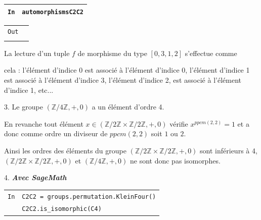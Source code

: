 \documentclass[titlepage]{article}
\begin{document}
    \begin{tabularx}{11.5cm}{|p{0.60cm}|X|}
        \hline
        \verb|In|
        & 
        \verb|automorphismsC2C2|
        \\
        \hline
    \end{tabularx}

    \begin{tabularx}{11.5cm}{|p{0.60cm}|X|}
        \hline
        \verb|Out|
        & 
        \verb|[[0, 1, 2, 3],
        [0, 1, 3, 2],
        [0, 2, 1, 3],
        |
        \\
        \verb||
        &
        \verb|[0, 2, 3, 1],
        [0, 3, 1, 2],
        [0, 3, 2, 1]]|
        \\
        \hline
    \end{tabularx}\newline

    La lecture d'un tuple $f$ de morphisme du type $[0, 3, 1, 2]$ s'effectue comme 
    
    cela : l'élément d'indice 0 est associé à l'élément d'indice 0,
    l'élément d'indice 1 est associé à l'élément d'indice 3, l'élément d'indice 2, est associé à l'élément d'indice 1, etc...
    \newline

    3. Le groupe $(\mathbb{Z}/4\mathbb{Z}, +, 0)$ a un élément d'ordre 4.\newline
    
    En revanche tout élément $x \in (\mathbb{Z}/2\mathbb{Z} \times \mathbb{Z}/2\mathbb{Z}, +, 0)$ vérifie $x^{ppcm(2,2)} = 1$ et a donc comme ordre un diviseur de $ppcm(2,2)$ soit $1$ ou $2$.\newline
    
    Ainsi les ordres des éléments du groupe $(\mathbb{Z}/2\mathbb{Z} \times \mathbb{Z}/2\mathbb{Z}, +, 0)$ sont inférieurs à 4, $(\mathbb{Z}/2\mathbb{Z} \times \mathbb{Z}/2\mathbb{Z}, +, 0)$ et $(\mathbb{Z}/4\mathbb{Z}, +, 0)$ ne sont donc pas isomorphes.\newline
    
    4. \textbf{\emph{Avec SageMath}}
    \newline


    \begin{tabularx}{11.5cm}{|p{0.60cm}|X|}
        \hline
        \verb|In|
        & 
        \verb|C2C2 = groups.permutation.KleinFour()|
        \\
        \verb||
        &
        \verb|C2C2.is_isomorphic(C4)|
        \\
        \hline
    \end{tabularx}
\end{document}
